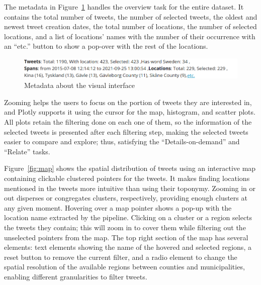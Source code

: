 The metadata in Figure~\ref{fig:meta_data} handles the overview task for the entire dataset. It
contains the total number of tweets, the number of selected tweets, the oldest and newest tweet
creation dates, the total number of locations, the number of selected locations, and a list of
locations' names with the number of their occurrence with an ``etc.'' button to show a pop-over
with the rest of the locations.

\begin{figure}[H]
    \begin{center}
        \includegraphics[width=\columnwidth]{./images/meta_data.png}
    \end{center}
    \caption{Metadata about the visual interface}
    \label{fig:meta_data}
\end{figure}


Zooming helps the users to focus on the portion of tweets they are interested in, and Plotly
supports it using the cursor for the map, histogram, and scatter plots. All plots retain the
filtering done on each one of them, so the information of the selected tweets is presented after
each filtering step, making the selected tweets easier to compare and explore; thus, satisfying the
``Details-on-demand'' and ``Relate'' tasks.

Figure~\ref{fig:map} shows the spatial distribution of tweets using an interactive map containing
clickable clustered pointers for the tweets. It makes finding locations mentioned in the tweets more
intuitive than using their toponymy. Zooming in or out disperses or congregates clusters,
respectively, providing enough clusters at any given moment. Hovering over a map pointer
shows a pop-up with the location name extracted by the pipeline. Clicking on a cluster or a region
selects the tweets they contain; this will zoom in to cover them while filtering out the unselected
pointers from the map. The top right section of the map has several elements: text elements showing
the name of the hovered and selected regions, a reset button to remove the current filter, and a
radio element to change the spatial resolution of the available regions between counties and
municipalities, enabling different granularities to filter tweets.

